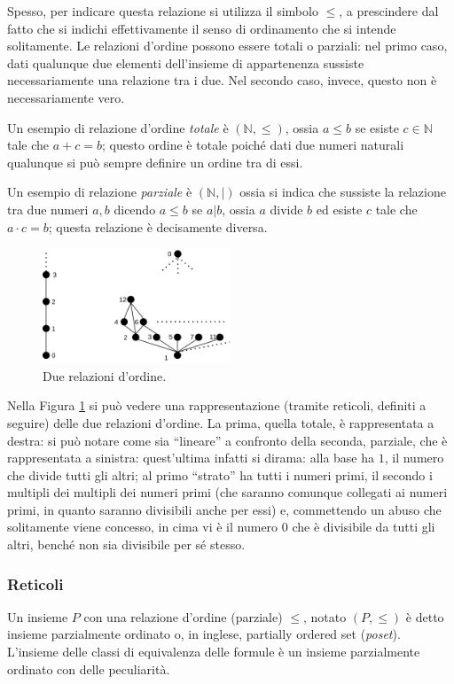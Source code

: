 Spesso, per indicare questa relazione si utilizza il simbolo $\leq$, a prescindere 
dal fatto che si indichi effettivamente il senso di ordinamento che si intende 
solitamente. Le relazioni d'ordine possono essere totali o parziali: nel 
primo caso, dati qualunque due elementi dell'insieme di appartenenza sussiste 
necessariamente una relazione tra i due. Nel secondo caso, invece, questo non 
è necessariamente vero. 

Un esempio di relazione d'ordine \textit{totale} è 
$(\mathbb{N}, \leq)$, ossia $a \leq b$ se esiste $c \in \mathbb{N}$ tale 
che $a + c = b$; questo ordine è totale poiché dati due numeri 
naturali qualunque si può sempre definire un ordine tra di essi.

Un esempio di relazione \textit{parziale} è 
$(\mathbb{N}, |)$ ossia si indica che sussiste la relazione 
tra due numeri $a, b$ dicendo $a \leq b$ se $a | b$, ossia $a$ divide $b$ 
ed esiste $c$ tale che $a \cdot c = b$; questa relazione è decisamente 
diversa.

\begin{figure}[!h]
  \centering 
  \includegraphics[width=0.5\textwidth]{images/reticolo2.png}
  \caption{Due relazioni d'ordine.}
  \label{figure:relazionireticoli}
\end{figure}

Nella Figura \ref{figure:relazionireticoli} si può vedere una rappresentazione 
(tramite reticoli, definiti a seguire) delle due relazioni d'ordine. 
La prima, quella totale, è rappresentata a destra: si può notare come sia 
``lineare'' a confronto della seconda, parziale, che è rappresentata a 
sinistra: quest'ultima infatti si dirama: alla base ha $1$, il numero che 
divide tutti gli altri; al primo ``strato'' ha tutti i numeri primi, 
il secondo i multipli dei multipli dei numeri primi (che saranno comunque collegati 
ai numeri primi, in quanto saranno divisibili anche per essi) e, commettendo 
un abuso che solitamente viene concesso, in cima vi è il numero $0$ che è divisibile 
da tutti gli altri, benché non sia divisibile per sé stesso. 

\subsubsection{Reticoli}
Un insieme $P$ con una relazione d'ordine (parziale) $\leq$, 
notato $(P, \leq)$ è detto insieme parzialmente ordinato 
o, in inglese, partially ordered set (\textit{poset}). 
L'insieme delle classi di equivalenza 
delle formule è un insieme parzialmente ordinato con delle peculiarità. 


